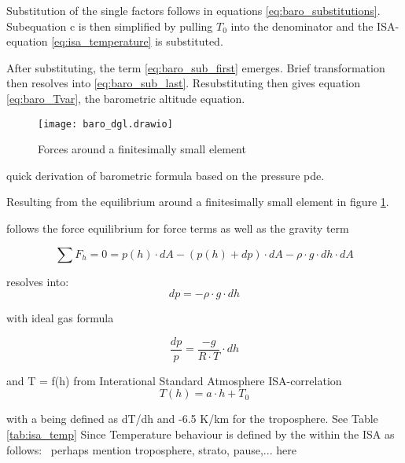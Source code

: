 Substitution of the single factors follows in equations \ref{eq:baro_substitutions}. Subequation c is then simplified by pulling $T_0$ into the denominator and the ISA-equation \ref{eq:isa_temperature} is substituted.

After substituting, the term \ref{eq:baro_sub_first} emerges. Brief transformation then resolves into \ref{eq:baro_sub_last}. Resubstituting then gives equation \ref{eq:baro_Tvar}, the barometric altitude equation.




\begin{figure}[h]
    \centering
    \texttt{[image: baro\_dgl.drawio]}
    \caption{Forces around a finitesimally small element}
    \label{fig:baro_FE}
\end{figure}



quick derivation of barometric formula based on the pressure pde.


Resulting from the equilibrium around a finitesimally small element in figure \ref{fig:baro_FE}.


follows the force equilibrium for force terms as well as the gravity term

\begin{equation}
    \sum{F_h} = 0 = p(h) \cdot dA - ( p(h) + dp )\cdot dA -  \rho \cdot g \cdot  dh \cdot dA
    \label{eq:baro_equilibrium}
\end{equation}

resolves into:
\begin{equation}
    dp=-\rho \cdot g\cdot dh
    \label{eq:baro_equilibrium_simple}
\end{equation}

with ideal gas formula

\begin{equation}
    \frac{dp}{p} = \frac{-g}{R \cdot T} \cdot dh
    \label{eq:baro_equilibrium_perfect}
\end{equation}

and T = f(h) from Interational Standard Atmosphere ISA-correlation
\begin{equation}
    T(h)= a  \cdot h + T_0
    \label{eq:isa_temperature}
\end{equation}

with a being defined as dT/dh and -6.5 K/km for the troposphere. See Table \ref{tab:isa_temp}
Since Temperature behaviour is defined by the \textcite{iso_standard_1975}  within the ISA as follows:
\
perhaps mention troposphere, strato, pause,... here

